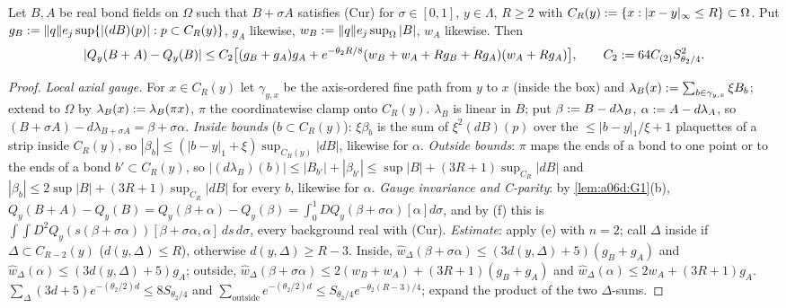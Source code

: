 \begin{lemma}\label{lem:a06d:G2}
Let $B,A$ be real bond fields on $\Omega$ such that $B+\sigma A$ satisfies (Cur) for $\sigma\in[0,1]$, $y\in\Lambda$, $R\ge2$ with $C_R(y):=\{x:|x-y|_\infty\le R\}\subset\Omega$. Put $g_B:=\lVert q\rVert e_j\sup\{|(dB)(p)|:p\subset C_R(y)\}$, $g_A$ likewise, $w_B:=\lVert q\rVert e_j\sup_\Omega|B|$, $w_A$ likewise. Then
\[
|Q_y(B+A)-Q_y(B)|\le C_2\big[(g_B+g_A)g_A+e^{-\theta_2R/8}(w_B+w_A+Rg_B+Rg_A)(w_A+Rg_A)\big],\qquad C_2:=64C_{(2)}S^2_{\theta_2/4}.
\]
\end{lemma}

\begin{proof}
\emph{Local axial gauge.} For $x\in C_R(y)$ let $\gamma_{y,x}$ be the axis-ordered fine path from $y$ to $x$ (inside the box) and $\lambda_B(x):=\sum_{b\in\gamma_{y,x}}\xi B_b$; extend to $\Omega$ by $\lambda_B(x):=\lambda_B(\pi x)$, $\pi$ the coordinatewise clamp onto $C_R(y)$. $\lambda_B$ is linear in $B$; put $\beta:= B-d\lambda_B$, $\alpha:= A-d\lambda_A$, so $(B+\sigma A)-d\lambda_{B+\sigma A}=\beta+\sigma\alpha$. \emph{Inside bounds} ($b\subset C_R(y)$): $\xi\beta_b$ is the sum of $\xi^2(dB)(p)$ over the $\le|b-y|_1/\xi+1$ plaquettes of a strip inside $C_R(y)$, so $|\beta_b|\le(|b-y|_1+\xi)\sup_{C_R(y)}|dB|$, likewise for $\alpha$. \emph{Outside bounds}: $\pi$ maps the ends of a bond to one point or to the ends of a bond $b'\subset C_R(y)$, so $|(d\lambda_B)(b)|\le|B_{b'}|+|\beta_{b'}|\le\sup|B|+(3R+1)\sup_{C_R}|dB|$ and $|\beta_b|\le2\sup|B|+(3R+1)\sup_{C_R}|dB|$ for every $b$, likewise for $\alpha$. \emph{Gauge invariance and C-parity}: by \cref{lem:a06d:G1}(b), $Q_y(B+A)-Q_y(B)=Q_y(\beta+\alpha)-Q_y(\beta)=\int_0^1DQ_y(\beta+\sigma\alpha)[\alpha]d\sigma$, and by (f) this is $\int\!\!\int D^2Q_y(s(\beta+\sigma\alpha))[\beta+\sigma\alpha,\alpha]\,ds\,d\sigma$, every background real with (Cur). \emph{Estimate}: apply (e) with $n=2$; call $\Delta$ inside if $\Delta\subset C_{R-2}(y)$ ($d(y,\Delta)\le R$), otherwise $d(y,\Delta)\ge R-3$. Inside, $\hat w_\Delta(\beta+\sigma\alpha)\le(3d(y,\Delta)+5)(g_B+g_A)$ and $\hat w_\Delta(\alpha)\le(3d(y,\Delta)+5)g_A$; outside, $\hat w_\Delta(\beta+\sigma\alpha)\le2(w_B+w_A)+(3R+1)(g_B+g_A)$ and $\hat w_\Delta(\alpha)\le2w_A+(3R+1)g_A$. $\sum_\Delta(3d+5)e^{-(\theta_2/2)d}\le8S_{\theta_2/4}$ and $\sum_{\text{outside}}e^{-(\theta_2/2)d}\le S_{\theta_2/4}e^{-\theta_2(R-3)/4}$; expand the product of the two $\Delta$-sums.
\end{proof}


